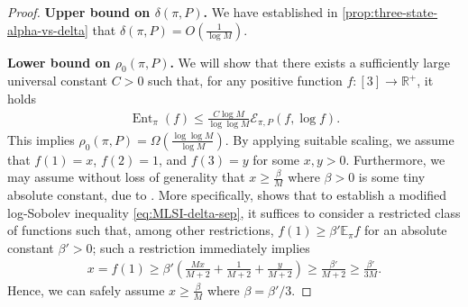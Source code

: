 \documentclass[11pt]{article}
\def\bE{\mathbb{E}}
\def\bR{\mathbb{R}}
\def\cE{\mathcal{E}}
\DeclareMathOperator\Ent{\mathrm{Ent}}
\theoremstyle{definition}
\begin{document}
\begin{proof}
  \textbf{Upper bound on $\delta(\pi, P)$.}
  We have established in \cref{prop:three-state-alpha-vs-delta} that $\delta(\pi, P) = O\left(\frac 1{\log M}\right)$.

  \textbf{Lower bound on $\rho_0(\pi, P)$.}
We will show that there exists a sufficiently large universal constant $C > 0$ such that, for any positive function $f: [3] \to \bR^+$, it holds
\begin{align}\label{eq:MLSI-delta-sep}
 \Ent_\pi(f) \le \frac{C \log M}{\log\log M} \cE_{\pi,P}(f,\log f).
\end{align}
This implies $\rho_0(\pi, P) = \Omega\left( \frac{\log\log M}{\log M} \right)$.
By applying suitable scaling, we assume that $f(1) = x$, $f(2) = 1$, and $f(3) = y$ for some $x,y > 0$.
Furthermore, we may assume without loss of generality that $x \ge \frac{\beta}{M}$ where $\beta > 0$ is some tiny absolute constant, due to \cite[Lemma 2.1]{tikhomirov2024regularized}.
More specifically, \cite[Lemma 2.1]{tikhomirov2024regularized} shows that to establish a modified log-Sobolev inequality \cref{eq:MLSI-delta-sep}, it suffices to consider a restricted class of functions such that, among other restrictions, $f(1) \ge \beta' \bE_\pi f$ for an absolute constant $\beta' > 0$; such a restriction immediately implies
\begin{align}
x = f(1) \ge \beta' \left( \frac{Mx}{M+2} + \frac{1}{M+2} + \frac{y}{M+2}  \right) \ge \frac{\beta'}{M+2} \ge \frac{\beta'}{3M}.
\end{align}
Hence, we can safely assume $x \ge \frac{\beta}{M}$ where $\beta = \beta'/3$.


\end{proof}
\end{document}
